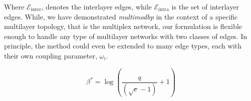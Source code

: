 \documentclass[11pt]{article}
\begin{document}


Where $\mathcal{E}_{\text{inter}}$, denotes the interlayer edges, while $\mathcal{E}_{\text{intra}}$ is the set of interlayer edges.  While, we have demonstrated \textit{multimodbp} in the context of a specific multilayer topology, that is the multiplex network, our formulation is flexible enough to handle any type of multilayer networks with two classes of edges.  In principle, the method could even be extended to many edge types, each with their own coupling parameter, $\omega_i$.  

\begin{equation} \label{eq:bstar}
\beta^*=\log\left(\frac{q}{(\sqrt{c}-1)}+1\right)
\end{equation}


\printbibliography

\end{document}
